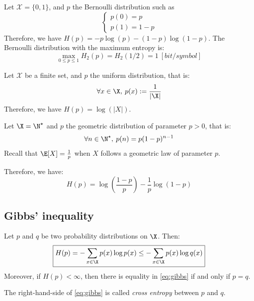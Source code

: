 \documentclass[toc, titlepaged]{../cs-classes/cs-classes}
\begin{document}
\begin{example}
    Let $\mathcal{X}=\{0, 1\}$, and $p$ the Bernoulli distribution such as
    \begin{equation*}
        \begin{cases}
            p(0) = p\\
            p(1) = 1 - p
        \end{cases}
    \end{equation*}
    Therefore, we have $H(p)=-p\log(p) - (1-p)\log(1-p)$. The Bernoulli distribution with the maximum entropy is:
    \begin{equation*}
        \max_{0\leq p\leq 1} H_2(p) = H_2(1/2) = 1 \: [bit/symbol]
    \end{equation*}
\end{example}

\begin{example}
    Let $\mathcal{X}$ be a finite set, and $p$ the uniform distribution, that is:
    \begin{equation*}
        \forall x\in \X, \: p(x) := \frac{1}{|\X|}
    \end{equation*}
    Therefore, we have $H(p) = \log(|X|)$.
\end{example}

\begin{example}
    Let $\X = \N^\star$ and $p$ the geometric distribution of parameter $p>0$, that is:
    \begin{equation*}
        \forall n\in \N^\star, \: p(n) = p(1-p)^{n-1}
    \end{equation*}
    Recall that $\E[X] = \frac{1}{p}$ when $X$ follows a geometric law of parameter $p$.

    Therefore, we have:
    \begin{equation*}
        H(p) = \log\left(\frac{1-p}{p}\right) - \frac{1}{p}\log(1-p)
    \end{equation*}
\end{example}

\subsection{Gibbs' inequality}
\begin{theorem}
    Let $p$ and $q$ be two probability distributions on $\X$. Then:
    \begin{equation}
        \label{eq:gibbs}
        \boxed{H(p) = -\sum_{x\in\X} p(x)\log p(x)  \leq - \sum_{x\in\X} p(x)\log q(x)}
    \end{equation}
    Moreover, if $H(p)<\infty$, then there is equality in \eqref{eq:gibbs} if and only if $p=q$.
\end{theorem}
The right-hand-side of \eqref{eq:gibbs} is called \emph{cross entropy} between $p$ and $q$.
\end{document}
